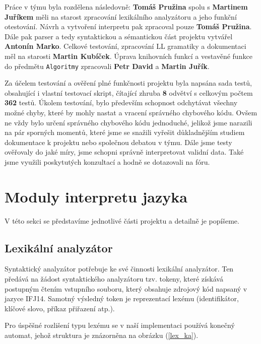 \documentclass[12pt,a4paper,titlepage,final]{article}
\begin{document}
Práce v týmu byla rozdělena následovně: \textbf{Tomáš Pružina} spolu s \textbf{Martinem Juříkem} měli na starost zpracování lexikálního analyzátoru a jeho funkční otestování. Návrh a vytvoření interpretu pak zpracoval pouze \textbf{Tomáš Pružina}. Dále pak parser a tedy syntaktickou a sémantickou část projektu vytvářel \textbf{Antonín Marko}. Celkové testování, zpracování LL gramatiky a dokumentaci měl na starosti \textbf{Martin Kubíček}. Úprava knihovních funkcí a vestavěné funkce do předmětu \verb|Algoritmy| zpracovali \textbf{Petr David} a \textbf{Martin Juřík}.

Za účelem testování a ověření plné funkčnosti projektu byla napsána sada testů, obsahující i vlastní testovací skript, čítající zhruba \textbf{8} odvětví s celkovým počtem \textbf{362} testů. Úkolem testování, bylo především schopnost odchytávat všechny možné chyby, které by mohly nastat a vracení správného chybového kódu. Ovšem ne vždy bylo určení správného chybového kódu jednoduché, jelikož jsme narazili na pár sporných momentů, které jsme se snažili vyřešit důkladnějším studiem dokumentace k projektu nebo společnou debatou v týmu. Dále jsme testy ověřovaly do jaké míry, jsme schopni správně interpretovat validní data. Také jsme využili poskytutých konzultací a hodně se dotazovali na fóru.

\section{Moduly interpretu jazyka} \label{moduly_interpretu}

V této sekci se představíme jednotlivé části projektu a detailně je popíšeme.
\subsection{Lexikální analyzátor} \label{lexikalni_analyzator}

Syntaktický analyzátor potřebuje ke své činnosti lexikální analyzátor. Ten
předává na žádost syntaktického analyzátoru tzv. tokeny, které získává postupným
čtením vstupního souboru, který obsahuje zdrojový kód napsaný v jazyce IFJ14.
Samotný výsledný token je reprezentací lexému (identifikátor, klíčové slovo,
příkaz přiřazení atp.).

Pro úspěšné rozlišení typu lexému se v naší implementaci používá konečný
automat, jehož struktura je znázorněna na obrázku (\ref{lex_ka}).
\end{document}
